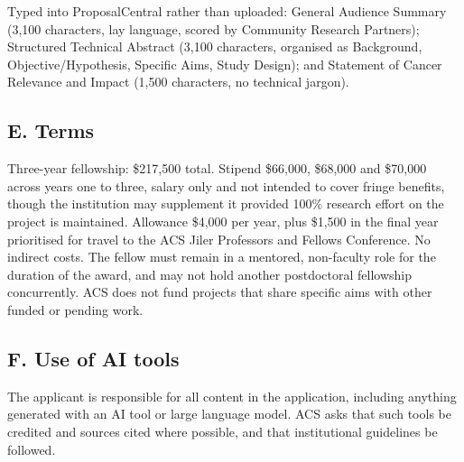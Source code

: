 Typed into ProposalCentral rather than uploaded: General Audience Summary
(3,100 characters, lay language, scored by Community Research Partners);
Structured Technical Abstract (3,100 characters, organised as Background,
Objective/Hypothesis, Specific Aims, Study Design); and Statement of Cancer
Relevance and Impact (1,500 characters, no technical jargon).

\subsection*{E. Terms}

Three-year fellowship: \$217,500 total. Stipend \$66,000, \$68,000 and \$70,000
across years one to three, salary only and not intended to cover fringe
benefits, though the institution may supplement it provided 100\% research
effort on the project is maintained. Allowance \$4,000 per year, plus \$1,500
in the final year prioritised for travel to the ACS Jiler Professors and
Fellows Conference. No indirect costs. The fellow must remain in a mentored,
non-faculty role for the duration of the award, and may not hold another
postdoctoral fellowship concurrently. ACS does not fund projects that share
specific aims with other funded or pending work.

\subsection*{F. Use of AI tools}

The applicant is responsible for all content in the application, including
anything generated with an AI tool or large language model. ACS asks that such
tools be credited and sources cited where possible, and that institutional
guidelines be followed.
\fi